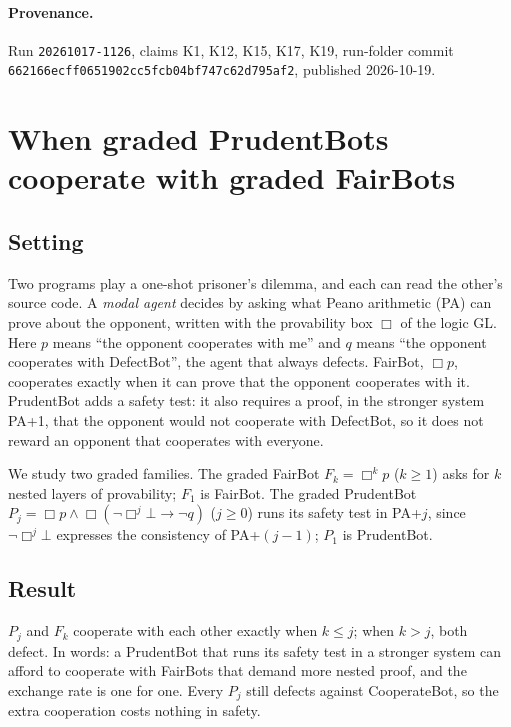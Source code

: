 \documentclass{article}
\begin{document}
\paragraph{Provenance.}
Run \texttt{20261017-1126}, claims K1, K12, K15, K17, K19, run-folder commit \texttt{662166ecff0651902cc5fcb04bf747c62d795af2}, published 2026-10-19.

\section{When graded PrudentBots cooperate with graded FairBots}
\label{sec:graded-prudent-fair}

\subsection*{Setting}

Two programs play a one-shot prisoner's dilemma, and each can read the other's source code. A
\emph{modal agent} \cite{barasz2014robust} decides by asking what Peano arithmetic (PA) can prove about
the opponent, written with the provability box $\Box$ of the logic GL. Here $p$ means ``the
opponent cooperates with me'' and $q$ means ``the opponent cooperates with DefectBot'', the agent
that always defects. FairBot, $\Box p$, cooperates exactly when it can prove that the opponent
cooperates with it. PrudentBot adds a safety test: it also requires a proof, in the stronger
system PA+1, that the opponent would not cooperate with DefectBot, so it does not reward an
opponent that cooperates with everyone.

We study two graded families. The graded FairBot $F_k = \Box^k p$ ($k \ge 1$) asks for $k$
nested layers of provability; $F_1$ is FairBot. The graded PrudentBot
$P_j = \Box p \wedge \Box(\neg\Box^j\bot \rightarrow \neg q)$ ($j \ge 0$) runs its safety test
in PA+$j$, since $\neg\Box^{j}\bot$ expresses the consistency of PA+$(j-1)$; $P_1$ is
PrudentBot.

\subsection*{Result}

$P_j$ and $F_k$ cooperate with each other exactly when $k \le j$; when $k > j$, both defect.
In words: a PrudentBot that runs its safety test in a stronger system can afford to cooperate
with FairBots that demand more nested proof, and the exchange rate is one for one. Every $P_j$
still defects against CooperateBot, so the extra cooperation costs nothing in safety.
\end{document}
